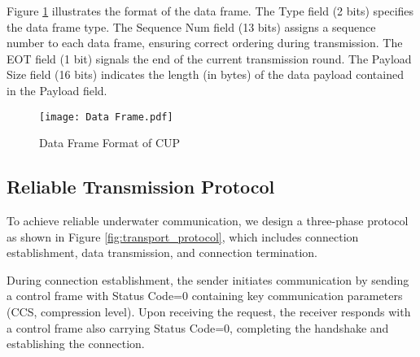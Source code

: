 \documentclass[preprint,12pt]{elsarticle}
\begin{document}

Figure \ref{fig:data-frame} illustrates the format of the data frame. The Type field (2 bits) specifies the data frame type. The Sequence Num field (13 bits) assigns a sequence number to each data frame, ensuring correct ordering during transmission. The EOT field (1 bit) signals the end of the current transmission round. The Payload Size field (16 bits) indicates the length (in bytes) of the data payload contained in the Payload field.

\begin{figure}[H]
\centering
    \texttt{[image: Data Frame.pdf]}
    \caption{Data Frame Format of CUP}
    \label{fig:data-frame}
\end{figure}

\subsection{Reliable Transmission Protocol}

To achieve reliable underwater communication, we design a three-phase protocol as shown in Figure \ref{fig:transport_protocol}, which includes connection establishment, data transmission, and connection termination.


During connection establishment, the sender initiates communication by sending a control frame with Status Code=0 containing key communication parameters (CCS, compression level). Upon receiving the request, the receiver responds with a control frame also carrying Status Code=0, completing the handshake and establishing the connection.

\end{document}

